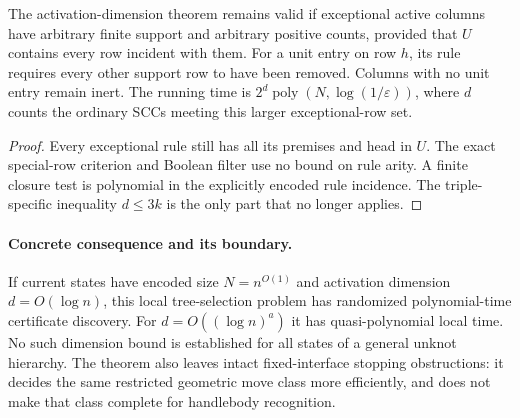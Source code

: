 \begin{corollary}
The activation-dimension theorem remains valid if exceptional active
columns have arbitrary finite support and arbitrary positive counts,
provided that $U$ contains every row incident with them.  For a unit entry
on row $h$, its rule requires every other support row to have been removed.
Columns with no unit entry remain inert.  The running time is
$2^d\operatorname{poly}(N,\log(1/\varepsilon))$, where $d$ counts the
ordinary SCCs meeting this larger exceptional-row set.
\end{corollary}
\begin{proof}
Every exceptional rule still has all its premises and head in $U$.
The exact special-row criterion and Boolean filter use no bound on rule
arity.  A finite closure test is polynomial in the explicitly encoded
rule incidence.  The triple-specific inequality $d\leq3k$ is the only
part that no longer applies.
\end{proof}

\paragraph{Concrete consequence and its boundary.}
If current states have encoded size $N=n^{O(1)}$ and activation dimension
$d=O(\log n)$, this local tree-selection problem has randomized
polynomial-time certificate discovery.  For $d=O((\log n)^a)$ it has
quasi-polynomial local time.  No such dimension bound is established for
all states of a general unknot hierarchy.  The theorem also leaves intact
fixed-interface stopping obstructions: it decides the same restricted
geometric move class more efficiently, and does not make that class
complete for handlebody recognition.

